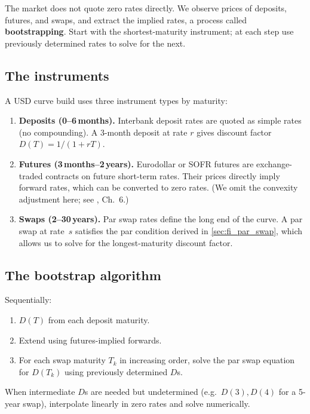 The market does not quote zero rates directly.  We observe prices of
deposits, futures, and swaps, and extract the implied rates, a
process called \textbf{bootstrapping}.  Start with the shortest-maturity instrument;
at each step use previously determined rates to solve for the next.

\subsection{The instruments}

A USD curve build uses three instrument types by maturity:

\begin{enumerate}
  \item \textbf{Deposits (0--6\,months).}  Interbank deposit rates are
    quoted as simple rates (no compounding).  A 3-month deposit at
    rate $r$ gives discount factor $D(T) = 1/(1+rT)$.

  \item \textbf{Futures (3\,months--2\,years).}  Eurodollar or SOFR
    futures are exchange-traded contracts on future short-term rates.
    Their prices directly imply forward rates, which can be converted
    to zero rates.  (We omit the convexity adjustment here; see
    \citeHull, Ch.~6.)

  \item \textbf{Swaps (2--30\,years).}  Par swap rates define the
    long end of the curve.  A par swap at rate~$s$ satisfies the
    par condition derived in \cref{sec:fi_par_swap}, which
    allows us to solve for the longest-maturity discount factor.
\end{enumerate}

\subsection{The bootstrap algorithm}

Sequentially:
\begin{enumerate}
  \item $D(T)$ from each deposit maturity.
  \item Extend using futures-implied forwards.
  \item For each swap maturity $T_k$ in increasing order, solve the
    par swap equation for $D(T_k)$ using previously determined $D$s.
\end{enumerate}

When intermediate $D$s are needed but undetermined (e.g.\ $D(3),D(4)$
for a 5-year swap), interpolate linearly in zero rates and solve
numerically.

